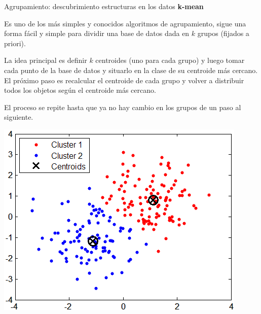 \documentclass[11pt]{beamer}
\begin{document}
\begin{frame}{Agrupamiento: descubrimiento estructuras en los datos}
\textbf{k-mean}


\scriptsize{Es uno de los m\'as simples y conocidos algoritmos de agrupamiento, sigue una forma f\'acil y simple para dividir una base de datos dada en $k$ grupos (fijados a priori).
	
La idea principal es definir $k$ centroides (uno para cada grupo) y luego tomar cada punto de la base de datos y situarlo en la clase de su centroide m\'as cercano. El pr\'oximo paso es recalcular el centroide de cada grupo y volver a distribuir todos los objetos seg\'un el centroide m\'as cercano.


El proceso se repite hasta que ya no hay cambio en los grupos de un paso al siguiente.}

 \begin{center}
 	\includegraphics[width=0.35 \textwidth]{ML14.png}	
 \end{center}
 
\end{frame}
\end{document}
